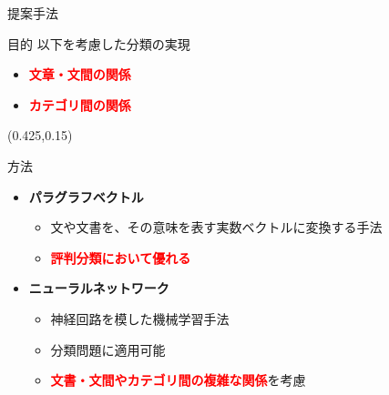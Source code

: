 \documentclass[aspectratio=43,unicode,10pt]{beamer}
\newcommand{\itemtitle}[1]{\textbf{#1}\\}
\newcommand{\fire}[1]{\textcolor{red}{\textbf{#1}}}
\begin{document}
\begin{frame}{提案手法}{}
  \begin{block}{目的}
    以下を考慮した分類の実現
    \begin{itemize}
      \item \fire{文章・文間の関係}
      \item \fire{カテゴリ間の関係}
    \end{itemize}
  \end{block}
  \begin{textblock}{0.6}(0.425,0.15)
    \fboxsep=2mm %
  \end{textblock}
  \begin{block}{方法}
    \begin{itemize}
      \item \itemtitle{パラグラフベクトル}
        \begin{itemize}
          \item 文や文書を、その意味を表す実数ベクトルに変換する手法
          \item \fire{評判分類において優れる}
        \end{itemize}
      \item \itemtitle{ニューラルネットワーク}
        \begin{itemize}
          \item 神経回路を模した機械学習手法
          \item 分類問題に適用可能
          \item \fire{文書・文間やカテゴリ間の複雑な関係}を考慮
        \end{itemize}
    \end{itemize}
  \end{block}
\end{frame}
\end{document}
